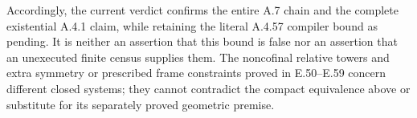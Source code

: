 Accordingly, the current verdict confirms the entire A.7
chain and the complete existential A.4.1 claim, while retaining
the literal A.4.57 compiler bound as pending.  It is neither
an assertion that this bound is false nor an assertion that an
unexecuted finite census supplies them.
The noncofinal relative towers and extra symmetry or prescribed
frame constraints proved in E.50--E.59 concern different closed
systems; they cannot contradict the compact equivalence above
or substitute for its separately proved geometric premise.
